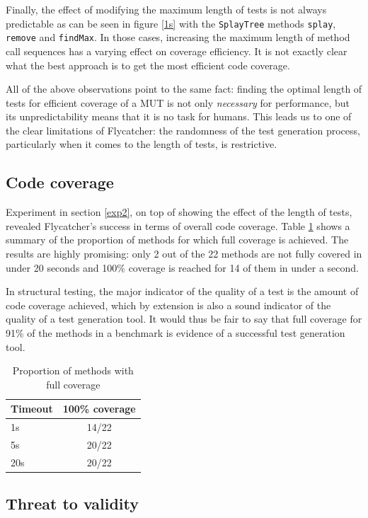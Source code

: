 Finally, the effect of modifying the maximum length of tests is not always predictable as can be seen in figure \ref{1s} with the \texttt{SplayTree} methods \texttt{splay}, \texttt{remove} and \texttt{findMax}. In those cases, increasing the maximum length of method call sequences has a varying effect on coverage efficiency. It is not exactly clear what the best approach is to get the most efficient code coverage.

All of the above observations point to the same fact: finding the optimal length of tests for efficient coverage of a MUT is not only \emph{necessary} for performance, but its unpredictability means that it is no task for humans. This leads us to one of the clear limitations of \textsf{Flycatcher}: the randomness of the test generation process, particularly when it comes to the length of tests, is restrictive.

\subsection{Code coverage}
Experiment in section \ref{exp2}, on top of showing the effect of the length of tests, revealed \textsf{Flycatcher}'s success in terms of overall code coverage. Table \ref{covresults} shows a summary of the proportion of methods for which full coverage is achieved. The results are highly promising: only 2 out of the 22 methods are not fully covered in under 20 seconds and 100\% coverage is reached for 14 of them in under a second.

In structural testing, the major indicator of the quality of a test is the amount of code coverage achieved, which by extension is also a sound indicator of the quality of a test generation tool. It would thus be fair to say that full coverage for 91\% of the methods in a benchmark is evidence of a successful test generation tool.

\begin{table}[t]
\centering
\begin{tabular}{|l|c|}
\hline
\textbf{Timeout} & \textbf{100\% coverage} \\
\hline
1s & 14/22 \\
5s & 20/22 \\
20s & 20/22 \\
\hline
\end{tabular}
\caption{Proportion of methods with full coverage}
\label{covresults}
\end{table}


\subsection{Threat to validity}

